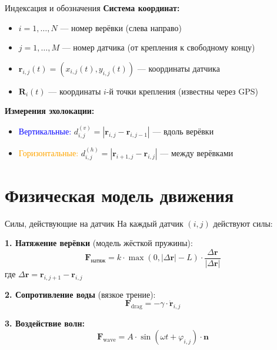 \documentclass[aspectratio=169, 12pt]{beamer}
\begin{document}
\begin{frame}{Индексация и обозначения}
    \textbf{Система координат:}
    \begin{itemize}
        \item $i = 1, \ldots, N$ --- номер верёвки (слева направо)
        \item $j = 1, \ldots, M$ --- номер датчика (от крепления к свободному концу)
        \item $\mathbf{r}_{i,j}(t) = (x_{i,j}(t), y_{i,j}(t))$ --- координаты датчика
        \item $\mathbf{R}_i(t)$ --- координаты $i$-й точки крепления (известны через GPS)
    \end{itemize}
    
    \vspace{0.5cm}
    \textbf{Измерения эхолокации:}
    \begin{itemize}
        \item \textcolor{blue}{Вертикальные:} $d_{i,j}^{(v)} = |\mathbf{r}_{i,j} - \mathbf{r}_{i,j-1}|$ --- вдоль верёвки
        \item \textcolor{orange}{Горизонтальные:} $d_{i,j}^{(h)} = |\mathbf{r}_{i+1,j} - \mathbf{r}_{i,j}|$ --- между верёвками
    \end{itemize}
\end{frame}

\section{Физическая модель движения}

\begin{frame}{Силы, действующие на датчик}
    На каждый датчик $(i, j)$ действуют силы:
    
    \vspace{0.3cm}
    \textbf{1. Натяжение верёвки} (модель жёсткой пружины):
    \[
    \mathbf{F}_{\text{натяж}} = k \cdot \max(0, |\Delta\mathbf{r}| - L) \cdot \frac{\Delta\mathbf{r}}{|\Delta\mathbf{r}|}
    \]
    где $\Delta\mathbf{r} = \mathbf{r}_{i,j+1} - \mathbf{r}_{i,j}$
    
    \vspace{0.3cm}
    \textbf{2. Сопротивление воды} (вязкое трение):
    \[
    \mathbf{F}_{\text{drag}} = -\gamma \cdot \dot{\mathbf{r}}_{i,j}
    \]
    
    \vspace{0.3cm}
    \textbf{3. Воздействие волн:}
    \[
    \mathbf{F}_{\text{wave}} = A \cdot \sin(\omega t + \varphi_{i,j}) \cdot \mathbf{n}
    \]
\end{frame}
\end{document}
